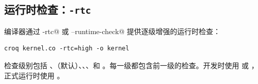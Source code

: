 \subsection*{运行时检查：\texttt{-rtc}}

编译器通过 \co@-rtc@ 或 \co@--runtime-check@ 提供逐级增强的运行时检查：

\begin{lstlisting}[language=croqtile,caption={设置运行时检查级别}]
croq kernel.co -rtc=high -o kernel
\end{lstlisting}

检查级别包括 \co@none@、\co@entry@（默认）、\co@low@、\co@medium@、\co@high@ 和 \co@all@。每一级都包含前一级的检查。开发时使用 \co@high@ 或 \co@all@，正式运行时使用 \co@none@。
